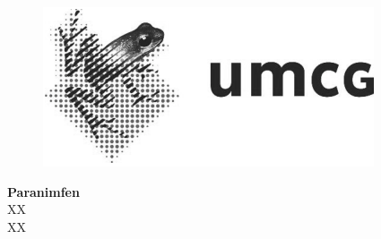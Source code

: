 \begin{figure}[!htbp]
  \centering

  \begin{minipage}[b]{0.24\textwidth}
    \includegraphics[width=\textwidth]{img/colofon_umcg_zw}
  \end{minipage}
  \hfill
  \begin{minipage}[b]{0.29\textwidth}
  \end{minipage}

\end{figure}

\clearpage



\clearpage

\noindent
\textbf{Paranimfen}\\
XX\\
XX\\
